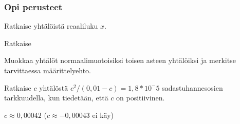 \begin{tehtavasivu}

\subsubsection*{Opi perusteet}

\begin{tehtava}
    Ratkaise yhtälöistä reaaliluku $x$.
    \begin{vastaus}
    \end{vastaus}
\end{tehtava}

\begin{tehtava} %
    Ratkaise
    \begin{vastaus}
    \end{vastaus}
\end{tehtava}

\begin{tehtava}
Muokkaa yhtälöt normaalimuotoisiksi toisen asteen yhtälöiksi ja merkitse tarvittaessa määrittelyehto.
    \begin{vastaus}
    \end{vastaus}
\end{tehtava}

\begin{tehtava}
Ratkaise $c$ yhtälöstä $c^2/(0,01-c)=1,8*10^-5$ sadastuhannesosien tarkkuudella, kun tiedetään, että $c$ on positiivinen.
	\begin{vastaus}
	$c\approx 0,00042$ ($c \approx -0,00043$ ei käy)
	\end{vastaus}
\end{tehtava}


\end{tehtavasivu}
